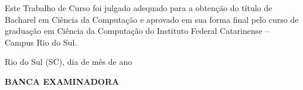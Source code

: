 \begin{folhadeaprovacao}

  \begin{center}
  \vspace*{-1.2cm}
    \textbf{\large\imprimirautor}
    
    \vspace*{\fill}\vspace*{\fill}\vspace*{\fill}
    \parbox{15cm}{
        \OnehalfSpacing\centering\large\textbf{\imprimirtitulo}
    }
    \vspace*{\fill}\vspace*{\fill}
    
    \hspace{.45\textwidth}
    \begin{minipage}{.5\textwidth}
        Este Trabalho de Curso foi julgado
        adequado para a obtenção do título de
        Bacharel em Ciência da Computação e
        aprovado em sua forma final pelo curso de
        graduação em Ciência da Computação do Instituto Federal Catarinense
        – Campus Rio do Sul. 

    \end{minipage}%
    \vspace*{\fill}
   \end{center}
    \vspace{-1cm}
  \begin{center}
  	 Rio do Sul (SC), dia de mês de ano
  \end{center}
  


  
   			  
    \begin{center}
  	\textbf{ BANCA EXAMINADORA}
   \end{center}
    

    \vspace*{1cm}
  
\end{folhadeaprovacao}